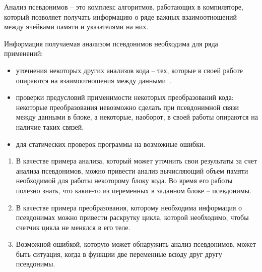 





\Intro


\begin{mydefinition}
Анализ псевдонимов -- это комплекс алгоритмов, работающих в компиляторе, который позволяет получать информацию о ряде важных взаимоотношений между ячейками памяти и указателями на них.
\end{mydefinition}

Информация получаемая анализом псевдонимов необходима для ряда применений:
\begin{itemize}
\item уточнения некоторых других анализов кода -- тех, которые в своей работе опираются на взаимоотношения между данными~\autocite{Voevodin}.
\item проверки предусловий применимости некоторых преобразований кода: некоторые преобразования невозможно сделать при псевдонимной связи между данными в блоке, а некоторые, наоборот, в своей работы опираются на наличие таких связей.
\item для статических проверок программы на возможные ошибки.
\end{itemize}

\begin{myexamples}
\begin{enumerate}
\item В качестве примера анализа, который может уточнить свои результаты за счет анализа псевдонимов, можно привести анализ вычисляющий объем памяти необходимой для работы некоторому блоку кода. Во время его работы полезно знать, что какие-то из переменных в заданном блоке -- псевдонимы.
\item В качестве примера преобразования, которому необходима информация о псевдонимах можно привести раскрутку цикла, которой необходимо, чтобы счетчик цикла не менялся в его теле.
\item Возможной ошибкой, которую может обнаружить анализ псевдонимов, может быть ситуация, когда в функции две переменные всюду друг другу псевдонимы.
\end{enumerate}
\end{myexamples}

